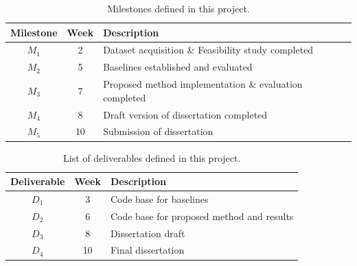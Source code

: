 \documentclass[a4paper,11pt]{article}
\begin{document}
\begin{table}[htbp]
    \begin{center}
        \begin{tabular}{|c|c|l|}
        \hline
        \textbf{Milestone} & \textbf{Week} & \textbf{Description} \\
        \hline
        $M_1$ & 2 & Dataset acquisition \& Feasibility study completed \\
        $M_2$ & 5 & Baselines established and evaluated \\
        $M_3$ & 7 & Proposed method implementation \& evaluation completed \\
        $M_4$ & 8 & Draft version of dissertation completed \\
        $M_5$ & 10 & Submission of dissertation \\
        \hline
        \end{tabular} 
    \end{center}
    \caption{Milestones defined in this project.}
    \label{fig:milestones}
\end{table}

\begin{table}[htbp]
    \begin{center}
        \begin{tabular}{|c|c|l|}
        \hline
        \textbf{Deliverable} & \textbf{Week} & \textbf{Description} \\
        \hline
        $D_1$ & 3 & Code base for baselines \\
        $D_2$ & 6 & Code base for proposed method and results \\
        $D_3$ & 8 & Dissertation draft \\
        $D_4$ & 10 & Final dissertation \\
        \hline
        \end{tabular} 
    \end{center}
    \caption{List of deliverables defined in this project.}
    \label{fig:deliverables}
\end{table}
\vskip -20mm

{
\footnotesize
}
\end{document}
